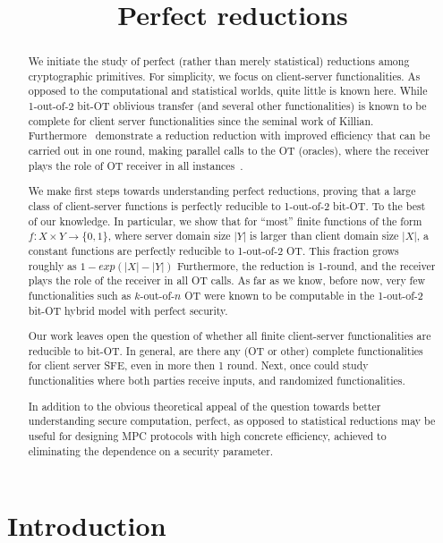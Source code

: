 \documentclass[a4paper]{article}
\title{Perfect reductions}
\begin{document}
\maketitle

\begin{abstract}
We initiate the study of perfect (rather than merely statistical) reductions among cryptographic primitives. For simplicity, we focus on client-server functionalities.
As opposed to the computational and statistical worlds, quite little is known here.
While 1-out-of-2 bit-OT oblivious transfer (and several other functionalities) is known to be complete for client server functionalities since the seminal work of Killian. Furthermore~\cite{IKOPSW11} demonstrate a reduction reduction with improved efficiency that can be carried out in one round, making parallel calls to the OT (oracles), where the receiver plays the role of OT receiver in all instances~\cite{IKOPSW11}.  

We make first steps towards understanding perfect reductions, proving that a large class of client-server functions is perfectly reducible to 1-out-of-2 bit-OT.
To the best of our knowledge. In particular, we show that for ``most'' finite functions of the form $f:X\times Y\rightarrow \{0,1\}$, where server domain size $|Y|$ is larger than client domain size $|X|$, a constant functions are perfectly reducible to 1-out-of-2 OT. This fraction grows roughly as $1-exp(|X|-|Y|)$
Furthermore, the reduction is 1-round, and the receiver plays the role of the receiver in all OT calls. As far as we know, before now, very few functionalities such as $k$-out-of-$n$ OT were known to be computable in the 1-out-of-2 bit-OT hybrid model with perfect security.

Our work leaves open the question of whether all finite client-server functionalities are reducible to bit-OT. In general, are there any (OT or other) complete functionalities for client server SFE, even in more then 1 round.
Next, once could study functionalities where both parties receive inputs, and randomized functionalities.
 
In addition to the obvious theoretical appeal of the question towards better understanding secure computation, perfect, as opposed to statistical reductions may be useful for designing MPC protocols with high concrete efficiency, achieved to eliminating the dependence on a security parameter.
\end{abstract}

\section{Introduction}
\end{document}
